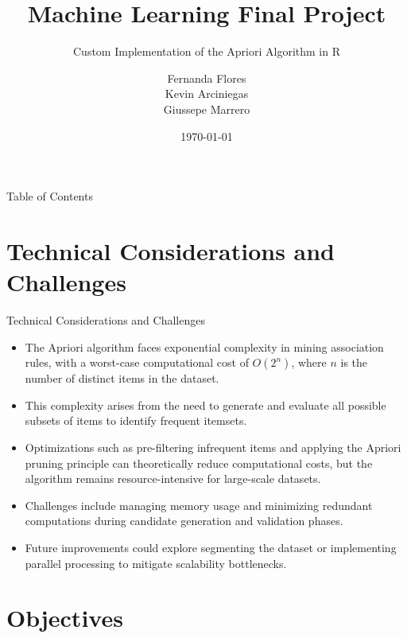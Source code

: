 \documentclass{beamer}
\title{Machine Learning Final Project}
\subtitle{Custom Implementation of the Apriori Algorithm in R}
\author{
\begin{tabular}{c} 
Fernanda Flores \\ 
Kevin Arciniegas \\ 
Giussepe Marrero
\end{tabular}
}
\institute{4Geeks Academy}
\date{\today}
\begin{document}
\begin{frame}
    \titlepage
\end{frame}

\begin{frame}{Table of Contents}
    \tableofcontents
\end{frame}

\section{Technical Considerations and Challenges}

\begin{frame}{Technical Considerations and Challenges}
    \begin{itemize}
        \item The Apriori algorithm faces exponential complexity in mining association rules, with a worst-case computational cost of \(O(2^n)\), where \(n\) is the number of distinct items in the dataset.
        \item This complexity arises from the need to generate and evaluate all possible subsets of items to identify frequent itemsets.
        \item Optimizations such as pre-filtering infrequent items and applying the Apriori pruning principle can theoretically reduce computational costs, but the algorithm remains resource-intensive for large-scale datasets.
        \item Challenges include managing memory usage and minimizing redundant computations during candidate generation and validation phases.
        \item Future improvements could explore segmenting the dataset or implementing parallel processing to mitigate scalability bottlenecks.
    \end{itemize}
\end{frame}

\section{Objectives}
\end{document}
